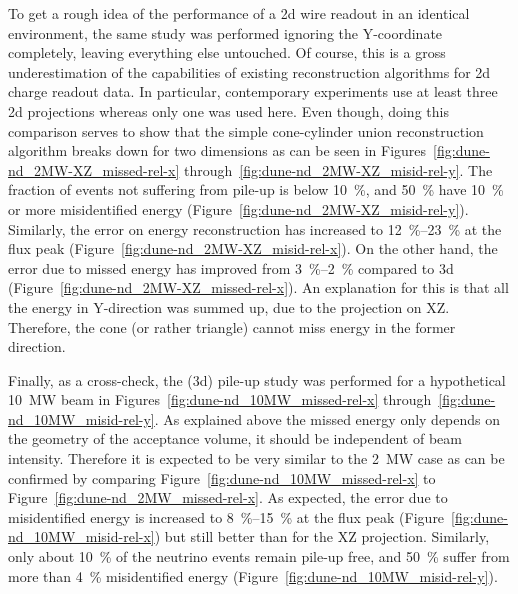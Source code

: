 To get a rough idea of the performance of a \gls{2d} wire readout in an identical environment, the same study was performed ignoring the Y-coordinate completely, leaving everything else untouched.
Of course, this is a gross underestimation of the capabilities of existing reconstruction algorithms for \gls{2d} charge readout data.
In particular, contemporary experiments use at least three \gls{2d} projections whereas only one was used here.
Even though, doing this comparison serves to show that the simple cone-cylinder union reconstruction algorithm breaks down for two dimensions as can be seen in Figures~\ref{fig:dune-nd_2MW-XZ_missed-rel-x} through~\ref{fig:dune-nd_2MW-XZ_misid-rel-y}.
The fraction of events not suffering from pile-up is below \SI{10}{\percent}, and \SI{50}{\percent} have \SI{10}{\percent} or more misidentified energy (Figure~\ref{fig:dune-nd_2MW-XZ_misid-rel-y}).
Similarly, the error on energy reconstruction has increased to \SIrange{12}{23}{\percent} at the flux peak (Figure~\ref{fig:dune-nd_2MW-XZ_misid-rel-x}).
On the other hand, the error due to missed energy has improved from \SIrange{3}{2}{\percent} compared to \gls{3d} (Figure~\ref{fig:dune-nd_2MW-XZ_missed-rel-x}).
An explanation for this is that all the energy in Y-direction was summed up, due to the projection on XZ.
Therefore, the cone (or rather triangle) cannot miss energy in the former direction.

Finally, as a cross-check, the (\gls{3d}) pile-up study was performed for a hypothetical \SI{10}{\mega\watt} beam in Figures~\ref{fig:dune-nd_10MW_missed-rel-x} through~\ref{fig:dune-nd_10MW_misid-rel-y}.
As explained above the missed energy only depends on the geometry of the acceptance volume, it should be independent of beam intensity.
Therefore it is expected to be very similar to the \SI{2}{\mega\watt} case as can be confirmed by comparing Figure~\ref{fig:dune-nd_10MW_missed-rel-x} to Figure~\ref{fig:dune-nd_2MW_missed-rel-x}.
As expected, the error due to misidentified energy is increased to \SIrange{8}{15}{\percent} at the flux peak (Figure~\ref{fig:dune-nd_10MW_misid-rel-x}) but still better than for the XZ projection.
Similarly, only about \SI{10}{\percent} of the neutrino events remain pile-up free, and \SI{50}{\percent} suffer from more than \SI{4}{\percent} misidentified energy (Figure~\ref{fig:dune-nd_10MW_misid-rel-y}).

